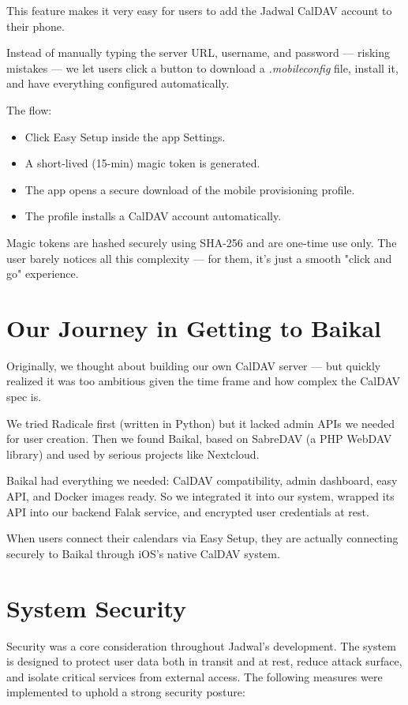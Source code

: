 This feature makes it very easy for users to add the Jadwal CalDAV account to their phone.

Instead of manually typing the server URL, username, and password — risking mistakes — we let users click a button to download a \textit{.mobileconfig} file, install it, and have everything configured automatically.

The flow:

\begin{itemize}
    \item Click Easy Setup inside the app Settings.
    \item A short-lived (15-min) magic token is generated.
    \item The app opens a secure download of the mobile provisioning profile.
    \item The profile installs a CalDAV account automatically.
\end{itemize}

Magic tokens are hashed securely using SHA-256 and are one-time use only. The user barely notices all this complexity — for them, it’s just a smooth "click and go" experience.

\section{Our Journey in Getting to Baikal}

Originally, we thought about building our own CalDAV server — but quickly realized it was too ambitious given the time frame and how complex the CalDAV spec is.

We tried Radicale first (written in Python) but it lacked admin APIs we needed for user creation. Then we found Baikal, based on SabreDAV (a PHP WebDAV library) and used by serious projects like Nextcloud.

Baikal had everything we needed: CalDAV compatibility, admin dashboard, easy API, and Docker images ready. So we integrated it into our system, wrapped its API into our backend Falak service, and encrypted user credentials at rest.

When users connect their calendars via Easy Setup, they are actually connecting securely to Baikal through iOS’s native CalDAV system.

\section{System Security}

Security was a core consideration throughout Jadwal's development. The system is designed to protect user data both in transit and at rest, reduce attack surface, and isolate critical services from external access. The following measures were implemented to uphold a strong security posture:

